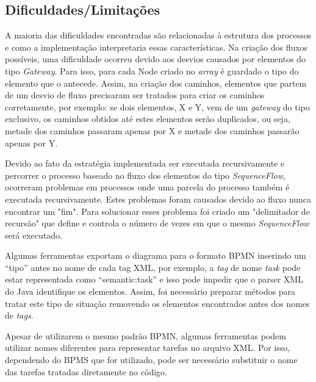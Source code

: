 \documentclass[12pt]{article}
\begin{document}
\subsection{Dificuldades/Limitações}
A maioria das dificuldades encontradas são relacionadas à estrutura dos processos e como a implementação interpretaria essas características. Na criação dos fluxos possíveis, uma dificuldade ocorreu devido aos desvios causados por elementos do tipo \emph{Gateway}. Para isso, para cada Node criado no \emph{array} é guardado o tipo do elemento que o antecede. Assim, na criação dos caminhos, elementos que partem de um desvio de fluxo precisaram ser tratados para criar os caminhos corretamente, por exemplo: se dois elementos, X e Y, vem de um \emph{gateway} do tipo  exclusivo, os caminhos obtidos até estes elementos serão duplicados, ou seja, metade dos caminhos passaram apenas por X e metade dos caminhos passarão apenas por Y.


Devido ao fato da estratégia implementada ser executada recursivamente e percorrer o processo baseado no fluxo dos elementos do tipo \emph{SequenceFlow}, ocorreram problemas em processos onde uma parcela do processo também é executada recursivamente. Estes problemas foram causados devido ao fluxo nunca encontrar um "fim". Para solucionar esses problema foi criado um "delimitador de recursão" que define e controla o número de vezes em que o mesmo \emph{SequenceFlow} será executado.

Algumas ferramentas exportam o diagrama para o formato BPMN inserindo um ``tipo'' antes no nome de cada tag XML, por exemplo, a \emph{tag} de nome \emph{task} pode estar representada como ``semantic:task'' e isso pode impedir que o parser XML do Java identifique os elementos. Assim, foi necessário preparar métodos para tratar este tipo de situação removendo os elementos encontrados antes dos nomes de \emph{tags}.

Apesar de utilizarem o mesmo padrão BPMN, algumas ferramentas podem utilizar nomes diferentes para representar tarefas no arquivo XML. Por isso, dependendo do BPMS que for utilizado, pode ser necessário substituir o nome das tarefas tratadas diretamente no código.
\end{document}

